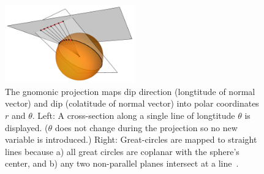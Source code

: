 \def\projectfigsize{5}
\begin{figure}
{\centering
    \includegraphics[width=0.5\textwidth]{gnomonic.png}
    \caption[Gnomonic projection]{The gnomonic projection maps dip direction (longtitude of normal vector) and dip (colatitude of normal vector) into polar coordinates $r$ and $\theta$. Left: A cross-section along a single line of longtitude $\theta$ is displayed. ($\theta$ does not change during the projection so no new variable is introduced.) Right: Great-circles are mapped to straight lines because a) all great circles are coplanar with the sphere's center, and b) any two non-parallel planes intersect at a line~\parencite{marozols_gnomonic_2022}.}
    \label{gnomonic}
}
\end{figure}